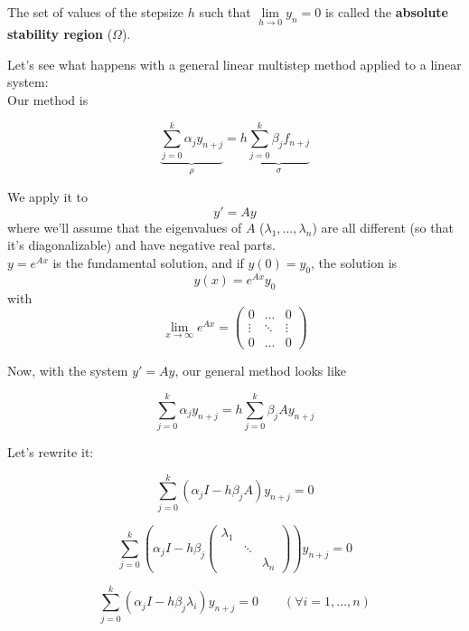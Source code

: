 \newpage

\begin{definition}
  The set of values of the stepsize $h$ such that $\lim\limits_{h\to0}y_n = 0$ is called the \textbf{absolute stability region} ($\Omega$).
\end{definition}

Let's see what happens with a general linear multistep method applied to a linear system:\\

Our method is

\[
  \underbrace{\sum_{j=0}^k\alpha_jy_{n+j}}_{\rho} = h\underbrace{\sum_{j=0}^k\beta_jf_{n+j}}_{\sigma}
\]

We apply it to $$y' = Ay$$ where we'll assume that the eigenvalues of $A$ ($\lambda_1, \ldots, \lambda_n$) are all different (so that it's diagonalizable) and have negative real parts. \\

$y = e^{Ax}$ is the fundamental solution, and if $y(0) = y_0$, the solution is $$y(x) = e^{Ax}y_0$$ with $$\lim_{x\to\infty}e^{Ax} = \begin{pmatrix}
                                               0      & \ldots & 0      \\
                                               \vdots & \ddots & \vdots \\
                                               0      & \ldots & 0
                                             \end{pmatrix}$$

Now, with the system $y' = Ay$, our general method looks like

\[
  \sum_{j=0}^k\alpha_jy_{n+j} = h\sum_{j=0}^k\beta_jAy_{n+j}
\]

Let's rewrite it:

$$\sum_{j=0}^k(\alpha_jI-h\beta_jA)y_{n+j} = 0$$
\begin{center}
\end{center}
$$\sum_{j=0}^k\left(\alpha_jI-h\beta_j\begin{pmatrix}\lambda_1 & & \\ & \ddots & \\ & & \lambda_n \end{pmatrix}\right)y_{n+j} = 0$$
\begin{center}
\end{center}
$$\sum_{j=0}^k(\alpha_jI-h\beta_j\lambda_i)y_{n+j} = 0 \qquad (\forall i = 1,\ldots,n)$$

